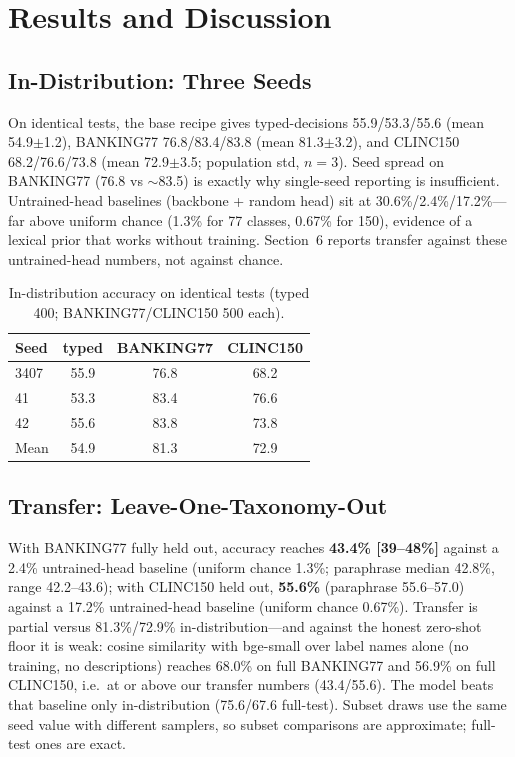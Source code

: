 \section{Results and Discussion}
\label{sec:results}
\subsection{In-Distribution: Three Seeds}
On identical tests, the base recipe gives typed-decisions 55.9/53.3/55.6
(mean 54.9$\pm$1.2), BANKING77 76.8/83.4/83.8 (mean 81.3$\pm$3.2), and CLINC150
68.2/76.6/73.8 (mean 72.9$\pm$3.5; population std, $n{=}3$). Seed spread on BANKING77 (76.8 vs $\sim$83.5) is
exactly why single-seed reporting is insufficient. Untrained-head baselines
(backbone + random head) sit at 30.6\%/2.4\%/17.2\%---far above uniform chance
(1.3\% for 77 classes, 0.67\% for 150), evidence of a lexical prior that works
without training. Section~6 reports transfer against these untrained-head
numbers, not against chance.

\begin{table}[htbp]
\caption{In-distribution accuracy on identical tests (typed 400; BANKING77/CLINC150 500 each).}
\label{tab:seeds}
\begin{center}
\setlength{\tabcolsep}{4pt}
\begin{small}
\begin{tabular}{lccc}
\toprule
Seed & typed & BANKING77 & CLINC150 \\
\midrule
3407 & 55.9 & 76.8 & 68.2 \\
41 & 53.3 & 83.4 & 76.6 \\
42 & 55.6 & 83.8 & 73.8 \\
Mean & 54.9 & 81.3 & 72.9 \\
\bottomrule
\end{tabular}
\end{small}
\end{center}
\end{table}

\subsection{Transfer: Leave-One-Taxonomy-Out}
With BANKING77 fully held out, accuracy reaches \textbf{43.4\% [39--48\%]}
against a 2.4\% untrained-head baseline (uniform chance 1.3\%; paraphrase median
42.8\%, range 42.2--43.6); with CLINC150
held out, \textbf{55.6\%} (paraphrase 55.6--57.0) against a 17.2\% untrained-head
baseline (uniform chance 0.67\%). Transfer
is partial versus 81.3\%/72.9\% in-distribution---and against the honest
zero-shot floor it is weak: cosine similarity with bge-small over label names
alone (no training, no descriptions) reaches 68.0\% on full BANKING77 and
56.9\% on full CLINC150, i.e.\ at or above our transfer numbers (43.4/55.6).
The model beats that baseline only in-distribution (75.6/67.6 full-test).
Subset draws use the same seed value with different samplers, so subset
comparisons are approximate; full-test ones are exact.

